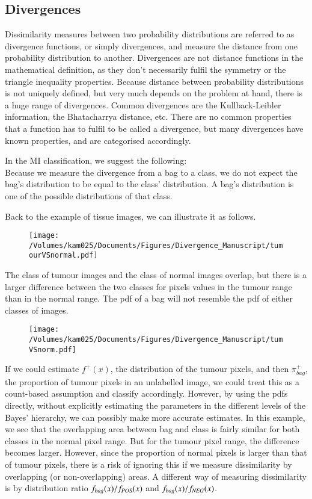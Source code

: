 \subsection{Divergences}

Dissimilarity measures between two probability distributions are referred to as divergence functions, or simply divergences, and measure the distance from one probability distribution to another. 
Divergences are not distance functions in the mathematical definition, as they don't necessarily fulfil the symmetry or the triangle inequality properties. 
Because distance between probability distributions is not uniquely defined, but very much depends on the problem at hand, there is a huge range of divergences. 
Common divergences are the Kullback-Leibler information, the Bhatacharrya distance, etc. 
There are no common properties that a function has to fulfil to be called a divergence, but many divergences have known properties, and are categorised accordingly. 

In the MI classification, we suggest the following:\\
Because we measure the divergence from a bag to a class, we do not expect the bag's distribution to be equal to the class' distribution. 
A bag's distribution is one of the possible distributions of that class. 

Back to the example of tissue images, we can illustrate it as follows. 
\begin{figure}[!h]
  \centering
    \texttt{[image: /Volumes/kam025/Documents/Figures/Divergence\_Manuscript/tumourVSnormal.pdf]}
\end{figure}
The class of tumour images and the class of normal images overlap, but there is a larger difference between the two classes for pixels values in the tumour range than in the normal range. 
The pdf of a bag will not resemble the pdf of either classes of images. 
\begin{figure}[!h]
  \centering
    \texttt{[image: /Volumes/kam025/Documents/Figures/Divergence\_Manuscript/tumVSnorm.pdf]}
\end{figure}

If we could estimate $f^+(x)$, the distribution of the tumour pixels, and then $\pi_{bag}^+$, the proportion of tumour pixels in an unlabelled image, we could treat this as a count-based assumption and classify accordingly. 
However, by using the pdfs directly, without explicitly estimating the parameters in the different levels of the Bayes' hierarchy, we can possibly make more accurate estimates. 
In this example, we see that the overlapping area between bag and class is fairly similar for both classes in the normal pixel range. 
But for the tumour pixel range, the difference becomes larger. 
However, since the proportion of normal pixels is larger than that of tumour pixels, there is a risk of ignoring this if we measure dissimilarity by overlapping (or non-overlapping) areas.
A different way of measuring dissimilarity is by distribution ratio $f_{bag}(x) /f_{\text{\scriptsize{{\it POS}}}}(x)$ and $f_{bag}(x) /f_{\text{\scriptsize{{\it NEG}}}}(x)$.








